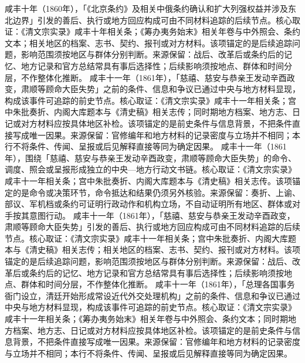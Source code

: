 咸丰十年（1860年），「《北京条约》及相关中俄条约确认和扩大列强权益并涉及东北边界」引发的善后、执行或地方回应构成可由不同材料追踪的后续节点。核心取证：《清文宗实录》咸丰十年相关条；《筹办夷务始末》相关年卷与中外照会、条约文本；相关地区的档案、志书、契约、报刊或对方材料。该项锚定的是后续追踪问题，影响范围须按地区与群体分别判断。来源保留：战后、改革后或条约后的记忆、地方记录和官方总结常具有事后选择性；后续影响须按地点、群体和时间分层，不作整体化推断。
咸丰十一年（1861年），「慈禧、慈安与恭亲王发动辛酉政变，肃顺等顾命大臣失势」之前的条件、信息和争议已通过中央与地方材料显现，构成该事件可追踪的前史节点。核心取证：《清文宗实录》咸丰十一年相关条；宫中朱批奏折、内阁大库题本与《清史稿》相关志传；同时期地方档案、地方志、日记或对方材料应按具体地区补检。该项锚定的是前史条件与信息背景，不把条件直接写成唯一因果。来源保留：官修编年和地方材料的记录密度与立场并不相同；本行不将条件、传闻、呈报或后见解释直接等同为确定因果。
咸丰十一年（1861年），围绕「慈禧、慈安与恭亲王发动辛酉政变，肃顺等顾命大臣失势」的命令、调度、照会或呈报形成独立的中央—地方行动文书链。核心取证：《清文宗实录》咸丰十一年相关条；宫中朱批奏折、内阁大库题本与《清史稿》相关志传。该项锚定的是命令或决策环节，命令抵达和结果仍须另外核验。来源保留：奏折、上谕、部议、军机档或条约可证明行政动作和机构立场，不自动证明所有地区、群体或对手按其意图行动。
咸丰十一年（1861年），「慈禧、慈安与恭亲王发动辛酉政变，肃顺等顾命大臣失势」引发的善后、执行或地方回应构成可由不同材料追踪的后续节点。核心取证：《清文宗实录》咸丰十一年相关条；宫中朱批奏折、内阁大库题本与《清史稿》相关志传；相关地区的档案、志书、契约、报刊或对方材料。该项锚定的是后续追踪问题，影响范围须按地区与群体分别判断。来源保留：战后、改革后或条约后的记忆、地方记录和官方总结常具有事后选择性；后续影响须按地点、群体和时间分层，不作整体化推断。
咸丰十一年（1861年），「总理各国事务衙门设立，清廷开始形成常设近代外交处理机构」之前的条件、信息和争议已通过中央与地方材料显现，构成该事件可追踪的前史节点。核心取证：《清文宗实录》咸丰十一年相关条；《筹办夷务始末》相关年卷与中外照会、条约文本；同时期地方档案、地方志、日记或对方材料应按具体地区补检。该项锚定的是前史条件与信息背景，不把条件直接写成唯一因果。来源保留：官修编年和地方材料的记录密度与立场并不相同；本行不将条件、传闻、呈报或后见解释直接等同为确定因果。
